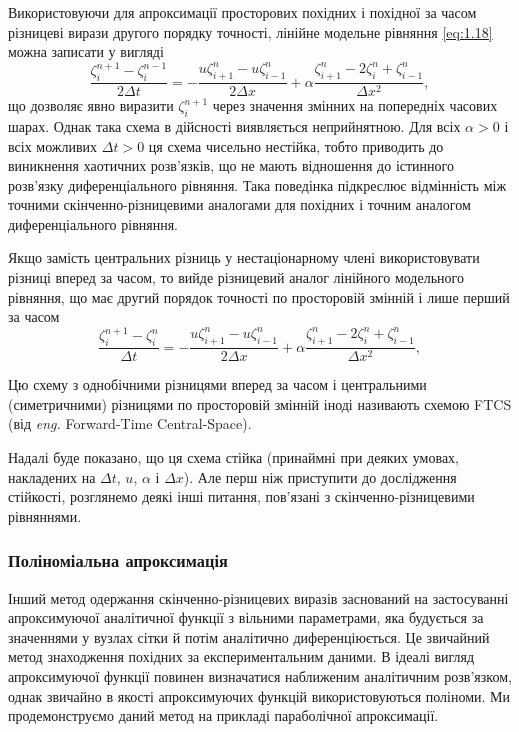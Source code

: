 Використовуючи для апроксимації просторових похідних і похідної за часом різницеві вирази другого порядку точності, лінійне модельне рівняння \eqref{eq:1.18} можна записати у вигляді
\begin{equation}
    \label{eq:2.17}
    \frac{\zeta_i^{n + 1} - \zeta_i^{n - 1}}{2 \Delta t} = - \frac{u \zeta_{i + 1}^n - u \zeta_{i - 1}^n}{2 \Delta x} + \alpha \frac{\zeta_{i + 1}^n - 2 \zeta_i^n + \zeta_{i - 1}^n}{\Delta x^2},
\end{equation}
що дозволяє явно виразити $\zeta_i^{n + 1}$ через значення змінних на попередніх часових шарах. Однак така схема в дійсності виявляється неприйнятною. Для всіх $\alpha > 0$ і всіх можливих $\Delta t > 0$ ця схема чисельно нестійка, тобто приводить до виникнення хаотичних розв'язків, що не мають відношення до істинного розв'язку диференціального рівняння. Така поведінка підкреслює відмінність між точними скінченно-різницевими аналогами для похідних і точним аналогом диференціального рівняння. \medskip

Якщо замість центральних різниць у нестаціонарному члені використовувати різниці вперед за часом, то вийде різницевий аналог лінійного модельного рівняння, що має другий порядок точності по просторовій змінній і лише перший за часом
\begin{equation}
    \label{eq:2.18}
    \frac{\zeta_i^{n + 1} - \zeta_i^n}{\Delta t} = - \frac{u \zeta_{i + 1}^n - u \zeta_{i - 1}^n}{2 \Delta x} + \alpha \frac{\zeta_{i + 1}^n - 2 \zeta_i^n + \zeta_{i - 1}^n}{\Delta x^2},
\end{equation}

\begin{definition}
    Цю схему з однобічними різницями вперед за часом і центральними (симетричними) різницями по просторовій змінній іноді називають схемою FTCS (від \textit{eng.} Forward-Time Central-Space).
\end{definition}

Надалі буде показано, що ця схема стійка (принаймні при деяких умовах, накладених на $\Delta t$, $u$, $\alpha$ і $\Delta x$). Але перш ніж приступити до дослідження стійкості, розглянемо деякі інші питання, пов'язані з скінченно-різницевими рівняннями.

\subsubsection{Поліноміальна апроксимація}

Інший метод одержання скінченно-різницевих виразів заснований на застосуванні апроксимуючої аналітичної функції з вільними параметрами, яка будується за значеннями у вузлах сітки й потім аналітично диференціюється. Це звичайний метод знаходження похідних за експериментальним даними. В ідеалі вигляд апроксимуючої функції повинен визначатися наближеним аналітичним розв'язком, однак звичайно в якості апроксимуючих функцій використовуються поліноми. Ми продемонструємо даний метод на прикладі параболічної апроксимації. \medskip

